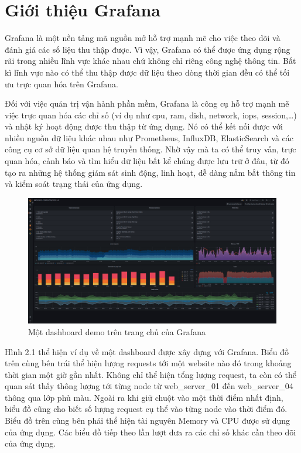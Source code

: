\section{Giới thiệu Grafana}
Grafana là một nền tảng mã nguồn mở hỗ trợ mạnh mẽ cho việc theo dõi và đánh giá các số liệu thu thập được. Vì vậy, Grafana có thể được ứng dụng rộng rãi trong nhiều lĩnh vực khác nhau chứ không chỉ riêng công nghệ thông tin. Bất kì lĩnh vực nào có thể thu thập được dữ liệu theo dòng thời gian đều có thể tối ưu trực quan hóa trên Grafana.

Đối với việc quản trị vận hành phần mềm, Grafana là công cụ hỗ trợ mạnh mẽ việc trực quan hóa các chỉ số (ví dụ như cpu, ram, dish, network, iops, session,…) và nhật ký hoạt động được thu thập từ ứng dụng. Nó có thể kết nối được với nhiều nguồn dữ liệu khác nhau như Prometheus, InfluxDB, ElasticSearch và các công cụ cơ sở dữ liệu quan hệ truyền thống. Nhờ vậy mà ta có thể truy vấn, trực quan hóa, cảnh báo và tìm hiểu dữ liệu bất kể chúng được lưu trữ ở đâu, từ đó tạo ra những hệ thống giám sát sinh động, linh hoạt, dễ dàng nắm bắt thông tin và kiểm soát trạng thái của ứng dụng.
\begin{figure}[H] %
    \centering %
    \includegraphics[width=1\textwidth]{figures/fig_01.png} 
    \caption{Một dashboard demo trên trang chủ của Grafana} %
    \label{fig:fig_01}
\end{figure}
Hình 2.1 thể hiện ví dụ về một dashboard được xây dựng với Grafana. Biểu đồ trên cùng bên trái thể hiện lượng requests tới một website nào đó trong khoảng thời gian một giờ gần nhất. Không chỉ thể hiện tổng lượng request, ta còn có thể quan sát thấy thông lượng tới từng node từ web\_server\_01 đến web\_server\_04 thông qua lớp phủ màu. Ngoài ra khi giữ chuột vào một thời điểm nhất định, biểu đồ cũng cho biết số lượng request cụ thể vào từng node vào thời điểm đó. Biểu đồ trên cùng bên phải thể hiện tài nguyên Memory và CPU được sử dụng của ứng dụng. Các biểu đồ tiếp theo lần lượt đưa ra các chỉ số khác cần theo dõi của ứng dụng.
